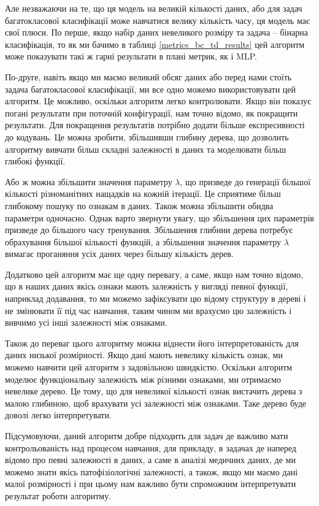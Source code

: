 Але незважаючи на те, що ця модель на великій кількості даних, або для задач багатокласової класифікації може навчатися велику кількість часу, ця модель має свої плюси. По перше, якщо набір даних невеликого розміру та задача -- бінарна класифікація, то як ми бачимо в таблиці \ref{metrics_bc_td_results} цей алгоритм може показувати такі ж гарні результати в плані метрик, як і MLP. 

По-друге, навіть якщо ми маємо великий обсяг даних або перед нами стоїть задача багатокласової класифікації, ми все одно можемо використовувати цей алгоритм. Це можливо, оскільки алгоритм легко контролювати. Якщо він показує погані результати при поточній конфігурації, нам точно відомо, як покращити результати. Для покращення результатів потрібно додати більше експресивності до кодувань. Це можна зробити, збільшивши глибину дерева, що дозволить алгоритму вивчати більш складні залежності в даних та моделювати більш глибокі функції. 

Або ж можна збільшити значення параметру $\lambda$, що призведе до генерації більшої кількості різноманітних нащадків на кожній ітерації. Це сприятиме більш глибокому пошуку по ознакам в даних. Також можна збільшити обидва параметри одночасно. Однак варто звернути увагу, що збільшення цих параметрів призведе до більшого часу тренування. Збільшення глибини дерева потребує обрахування більшої кількості функцій, а збільшення значення параметру $\lambda$ вимагає проганяння усіх даних через більшу кількість дерев. 

Додатково цей алгоритм має ще одну перевагу, а саме, якщо нам точно відомо, що в наших даних якісь ознаки мають залежність у вигляді певної функції, наприклад додавання, то ми можемо зафіксувати цю відому структуру в дереві і не змінювати її під час навчання, таким чином ми врахуємо цю залежність і вивчимо усі інші залежності між ознаками. 

Також до переваг цього алгоритму можна віднести його інтерпретованість для даних низької розмірності. Якщо дані мають невелику кількість ознак, ми можемо навчити цей алгоритм з задовільною швидкістю. Оскільки алгоритм моделює функціональну залежність між різними ознаками, ми отримаємо невелике дерево. Це тому, що для невеликої кількості ознак вистачить дерева з малою глибиною, щоб врахувати усі залежності між ознаками. Таке дерево буде доволі легко інтерпретувати. 

Підсумовуючи, даний алгоритм добре підходить для задач де важливо мати контрольованість над процесом навчання, для прикладу, в задачах де наперед відомо про певні залежності в даних, а саме в аналізі медичних даних, де ми можемо знати якісь патофізіологічні залежності, а також, якщо ми маємо дані малої розмірності і при цьому нам важливо бути спроможним інтерпретувати результат роботи алгоритму.


